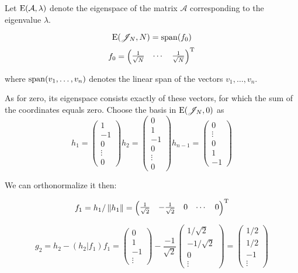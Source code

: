 \documentclass{article}
\begin{document}
Let $\mathrm{E}({\mathcal A}, {\lambda})$ denote the eigenspace of the matrix $\mathcal A$
corresponding to the eigenvalue $\lambda$.

\begin{propose}
    $$\mathrm{E}({\mathscr{J}_{N}}, {N}) = \mathrm{span}({f_0})$$
    $$f_0 = \begin{pmatrix} \frac{1}{\sqrt N} & \cdots & \frac{1}{\sqrt N} \end{pmatrix}^{\mathrm{T}}$$

        where $\mathrm{span}({v_1, \ldots, v_n})$ denotes the linear span of the vectors $v_1, \ldots, v_n$.
\end{propose}

As for zero, its eigenspace consists exactly of these vectors,
for which the sum of the coordinates equals zero.
Choose the basis in $\mathrm{E}({\mathscr{J}_{N}}, {0})$ as
$$
h_1 = \begin{pmatrix}1 \\ -1 \\ 0 \\ \vdots \\ 0\end{pmatrix}
    h_2 = \begin{pmatrix}0 \\ 1 \\ -1 \\ 0 \\ \vdots \\ 0\end{pmatrix}
        h_{n-1} = \begin{pmatrix}0 \\ \vdots \\ 0 \\ 1 \\ -1 \end{pmatrix}$$

            We can orthonormalize it then:

$$f_1 = h_1 / \left\|{h_1}\right\| =
\begin{pmatrix}\frac{1}{\sqrt2} & - \frac{1}{\sqrt2} & 0 & \cdots & 0 \end{pmatrix}^{\mathrm{T}}$$

    $$g_2 = h_2 - \left(h_2|f_1\right)f_1 =
\begin{pmatrix}0\\ 1\\ -1\\ \vdots\end{pmatrix}
    -
\frac{-1}{\sqrt2} \begin{pmatrix} 1/\sqrt2 \\ - 1/\sqrt2 \\ 0 \\ \vdots \end{pmatrix}
    = \begin{pmatrix} 1/2 \\ 1/2 \\ -1 \\ \vdots \end{pmatrix}$$
\end{document}
